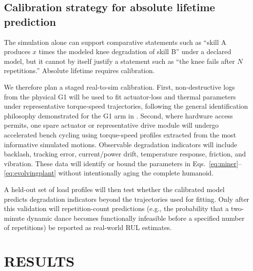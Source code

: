 \documentclass[letterpaper,10pt,conference]{ieeeconf}
\newif\ifdraftnotes
\newcommand{\tbd}[1]{\ifdraftnotes\par\noindent\textbf{[DRAFT TODO: #1]}\par\fi}
\begin{document}
\subsection{Calibration strategy for absolute lifetime prediction}

The simulation alone can support comparative statements such as ``skill A produces $x$ times the modeled knee degradation of skill B'' under a declared model, but it cannot by itself justify a statement such as ``the knee fails after $N$ repetitions.'' Absolute lifetime requires calibration.

We therefore plan a staged real-to-sim calibration. First, non-destructive logs from the physical G1 will be used to fit actuator-loss and thermal parameters under representative torque-speed trajectories, following the general identification philosophy demonstrated for the G1 arm in \cite{deniz2026g1}. Second, where hardware access permits, one spare actuator or representative drive module will undergo accelerated bench cycling using torque-speed profiles extracted from the most informative simulated motions. Observable degradation indicators will include backlash, tracking error, current/power drift, temperature response, friction, and vibration. These data will identify or bound the parameters in Eqs.~\eqref{eq:miner}--\eqref{eq:evolvingplant} without intentionally aging the complete humanoid.

A held-out set of load profiles will then test whether the calibrated model predicts degradation indicators beyond the trajectories used for fitting. Only after this validation will repetition-count predictions (e.g., the probability that a two-minute dynamic dance becomes functionally infeasible before a specified number of repetitions) be reported as real-world RUL estimates.

\tbd{Fill exact simulator version, G1 asset, policy sources, control/physics rates, number of environments, GPU, training steps, and all randomization ranges.}

\section{RESULTS}

\tbd{RESULTS PLACEHOLDER -- do not invent values. Add: (1) throughput/scaling plot for 1k/4k/8k/16k environments; (2) per-joint motion-to-degradation heat map; (3) survival curves for at least four lifetime schedules; (4) first-joint-to-failure distribution; (5) nominal vs degradation-aware Pareto plot; (6) ablation table; (7) calibration/held-out prediction plot if hardware data are available.}
\end{document}
